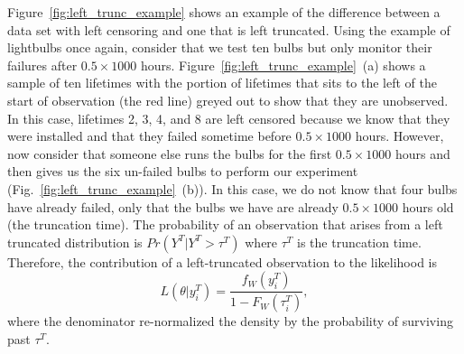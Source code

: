 Figure~\ref{fig:left_trunc_example} shows an example of the difference between a data set with left censoring and one that is left truncated. Using the example of lightbulbs once again, consider that we test ten bulbs but only monitor their failures after $0.5 \times 1000$ hours. Figure~\ref{fig:left_trunc_example}~(a) shows a sample of ten lifetimes with the portion of lifetimes that sits to the left of the start of observation (the red line) greyed out to show that they are unobserved. In this case, lifetimes 2, 3, 4, and 8 are left censored because we know that they were installed and that they failed sometime before $0.5 \times 1000$ hours. However, now consider that someone else runs the bulbs for the first $0.5 \times 1000$ hours and then gives us the six un-failed bulbs to perform our experiment (Fig.~\ref{fig:left_trunc_example}~(b)). In this case, we do not know that four bulbs have already failed, only that the bulbs we have are already $0.5 \times 1000$ hours old (the truncation time). The probability of an observation that arises from a left truncated distribution is $Pr(Y^T|Y^T > \tau^T)$ where $\tau^T$ is the truncation time. Therefore, the contribution of a left-truncated observation to the likelihood is
\begin{equation}
    \label{eq:left_trunc}
    L\left(\theta|y^T_i\right) = \frac{f_W\left(y^T_i\right)}{1 - F_W\left(\tau^{T}_i\right)},
\end{equation}
where the denominator re-normalized the density by the probability of surviving past $\tau^T$.


